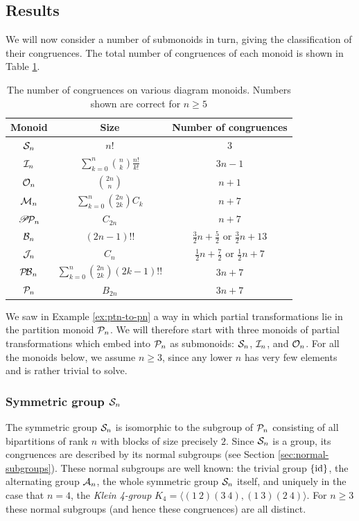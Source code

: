 \subsection{Results}
\label{sec:other-monoids-results}
We will now consider a number of submonoids in turn, giving the classification
of their congruences.  The total number of congruences of each monoid is shown
in Table \ref{tab:other-monoids}.

\begin{table}[h]
  \centering
  \renewcommand\arraystretch{1.5}
  \begin{tabular}{| c | c | c |}
    \hline
    Monoid & Size & Number of congruences \\
    \hline
    $\mathcal{S}_n$ & $n!$ & $3$ \\
    $\mathcal{I}_n$ & $\sum_{k=0}^n \binom{n}{k} \frac{n!}{k!}$ & $3n - 1$ \\
    $\mathcal{O}_n$ & $\binom{2n}{n}$ & $n + 1$ \\
    $\mathcal{M}_n$ & $\sum_{k=0}^n \binom{2n}{2k}C_k$ & $n + 7$ \\
    $\mathscr{P}\!\mathcal{P}_n$ & $C_{2n}$ & $n + 7$ \\
    $\mathcal{B}_n$ & $(2n - 1)!!$ & $\frac{3}{2}n + \frac{5}{2}$ or $\frac{3}{2}n + 13$ \\
    $\mathcal{J}_n$ & $C_n$ & $\frac{1}{2}n + \frac{7}{2}$ or $\frac{1}{2}n + 7$ \\
    $\mathcal{P\!B}_n$ & $\sum_{k=0}^n \binom{2n}{2k} (2k-1)!!$ & $3n + 7$ \\
    $\mathcal{P}_n$ & $B_{2n}$ & $3n + 7$ \\
    \hline
  \end{tabular}
  \caption[The number of congruences on various diagram monoids]{The number of
    congruences on various diagram monoids.  Numbers shown are correct for
    $n \geq 5$}
  \label{tab:other-monoids}
\end{table}

We saw in Example \ref{ex:ptn-to-pn} a way in which partial transformations lie
in the partition monoid $\mathcal{P}_n$.  We will therefore start with three monoids of
partial transformations which embed into $\mathcal{P}_n$ as submonoids: $\mathcal{S}_n$,
$\mathcal{I}_n$, and $\mathcal{O}_n$.  For all the monoids below, we assume $n \geq 3$, since any
lower $n$ has very few elements and is rather trivial to solve.

\subsubsection{Symmetric group $\mathcal{S}_n$}
The symmetric group $\mathcal{S}_n$ is isomorphic to the subgroup of $\mathcal{P}_n$
consisting of all bipartitions of rank $n$ with blocks of size precisely $2$.
Since $\mathcal{S}_n$ is a group, its congruences are described by its normal subgroups
(see Section \ref{sec:normal-subgroups}).  These normal subgroups are well
known: the trivial group $\{\operatorname{id}\}$, the alternating group $\mathcal{A}_n$, the whole
symmetric group $\mathcal{S}_n$ itself, and uniquely in the case that $n=4$, the
\textit{Klein 4-group} $K_4 = \langle (1~2)(3~4), (1~3)(2~4) \rangle$.  For
$n \geq 3$ these normal subgroups (and hence these congruences) are all
distinct.

